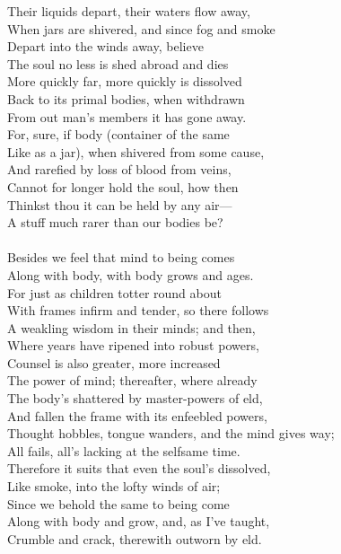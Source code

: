 Their liquids depart, their waters flow away,\\
When jars are shivered, and since fog and smoke\\
Depart into the winds away, believe\\
The soul no less is shed abroad and dies\\
More quickly far, more quickly is dissolved\\
Back to its primal bodies, when withdrawn\\
From out man's members it has gone away.\\
For, sure, if body (container of the same\\
Like as a jar), when shivered from some cause,\\
And rarefied by loss of blood from veins,\\
Cannot for longer hold the soul, how then\\
Thinkst thou it can be held by any air—\\
A stuff much rarer than our bodies be?\\
\\
Besides we feel that mind to being comes\\
Along with body, with body grows and ages.\\
For just as children totter round about\\
With frames infirm and tender, so there follows\\
A weakling wisdom in their minds; and then,\\
Where years have ripened into robust powers,\\
Counsel is also greater, more increased\\
The power of mind; thereafter, where already\\
The body's shattered by master-powers of eld,\\
And fallen the frame with its enfeebled powers,\\
Thought hobbles, tongue wanders, and the mind gives way;\\
All fails, all's lacking at the selfsame time.\\
Therefore it suits that even the soul's dissolved,\\
Like smoke, into the lofty winds of air;\\
Since we behold the same to being come\\
Along with body and grow, and, as I've taught,\\
Crumble and crack, therewith outworn by eld.\\
